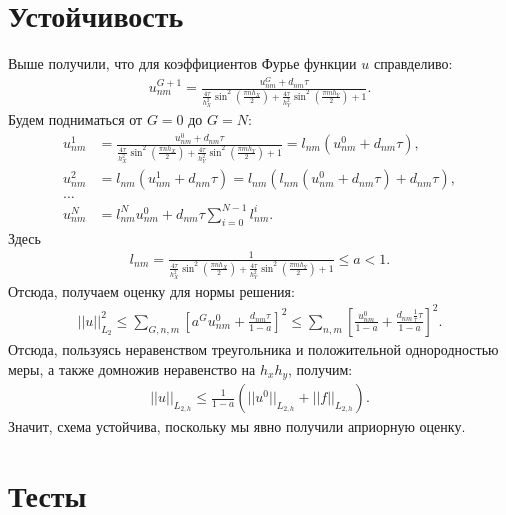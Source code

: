 \documentclass[14pt,a4paper]{extarticle}
\newcommand{\1}{\mathbbm{1}}
\begin{document}
\section{Устойчивость}
Выше получили, что для коэффициентов Фурье функции $u$ справделиво:
\begin{align*}
    u_{nm}^{G+1} = \frac{u_{nm}^G + d_{nm} \tau}{\frac{4 \tau}{h_X^2} \sin ^2\left(\frac{\pi n h_X}{2}\right)
    +  \frac{4 \tau}{h_Y^2} \sin ^2\left(\frac{\pi m h_Y}{2}\right) + 1}.
\end{align*}
Будем подниматься от $G=0$ до $G=N$:
\begin{align*}
    u_{nm}^{1} &= \frac{u_{nm}^0 + d_{nm} \tau}{\frac{4 \tau}{h_X^2} \sin ^2\left(\frac{\pi n h_X}{2}\right)
    +  \frac{4 \tau}{h_Y^2} \sin ^2\left(\frac{\pi m h_Y}{2}\right) + 1} = l_{nm} (u_{nm}^0 + d_{nm} \tau), \\
    u_{nm}^{2} &= l_{nm} (u_{nm}^1 + d_{nm} \tau) = l_{nm} (l_{nm} (u_{nm}^0 + d_{nm} \tau)+ d_{nm} \tau), \\
    \ldots \\
    u_{nm}^{N} &=l_{nm}^N u_{nm}^0 + d_{nm} \tau \sum _{i=0}^{N-1} l_{nm}^i. 
\end{align*}
Здесь 
\begin{align*}
    l_{nm} = \frac{1}{\frac{4 \tau}{h_X^2} \sin ^2\left(\frac{\pi n h_X}{2}\right)
    +  \frac{4 \tau}{h_Y^2} \sin ^2\left(\frac{\pi m h_Y}{2}\right) + 1} \leq a < 1.
\end{align*}
Отсюда, получаем оценку для нормы решения:
\begin{align*}
    ||u||_{L_{2}}^2\leq \sum_{G, n, m} \left[a^G u_{nm}^0 + \frac{d_{nm} \tau}{1-a}\right]^2  
    \leq \sum_{n, m} \left[\frac{u^0_{nm}}{1 - a} + \frac{d_{nm} \frac{1}{\tau}  \tau}{1-a}\right]^2 .
\end{align*}
Отсюда, пользуясь неравенством треугольника и положительной однородностью меры, а также домножив неравенство на $h_x h_y$, получим:
\begin{align*}
    ||u||_{L_{2, h}}\leq \frac{1}{1-a}\left( ||u^0||_{L_{2, h}} + ||f||_{L_{2, h}}\right) .
\end{align*}
Значит, схема устойчива, поскольку мы явно получили априорную оценку.
\section{Тесты}
\end{document}
